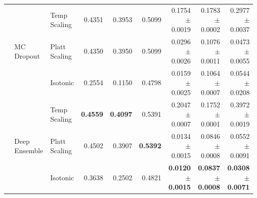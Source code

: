 \begin{table}[t]
\begin{tabular}{ll l rrrrrr}
\cmidrule(lr){2-9}
 & \multirow{3}{*}{MC Dropout} & Temp Scaling & 0.4351 & 0.3953 & 0.5099 & 0.1754 $\pm$ 0.0019 & 0.1783 $\pm$ 0.0002 & 0.2977 $\pm$ 0.0037 \\
 &  & Platt Scaling & 0.4350 & 0.3950 & 0.5099 & 0.0296 $\pm$ 0.0026 & 0.1076 $\pm$ 0.0011 & 0.0473 $\pm$ 0.0055 \\
 &  & Isotonic & 0.2554 & 0.1150 & 0.4798 & 0.0159 $\pm$ 0.0025 & 0.1064 $\pm$ 0.0007 & 0.0544 $\pm$ 0.0208 \\
\cmidrule(lr){2-9}
 & \multirow{3}{*}{Deep Ensemble} & Temp Scaling & \textbf{0.4559} & \textbf{0.4097} & 0.5391 & 0.2047 $\pm$ 0.0007 & 0.1752 $\pm$ 0.0001 & 0.3972 $\pm$ 0.0019 \\
 &  & Platt Scaling & 0.4502 & 0.3907 & \textbf{0.5392} & 0.0134 $\pm$ 0.0015 & 0.0846 $\pm$ 0.0008 & 0.0552 $\pm$ 0.0091 \\
 &  & Isotonic & 0.3638 & 0.2502 & 0.4821 & \textbf{0.0120 $\pm$ 0.0015} & \textbf{0.0837 $\pm$ 0.0008} & \textbf{0.0308 $\pm$ 0.0071} \\
\cmidrule(lr){2-9}
\bottomrule
\end{tabular}
\end{table}